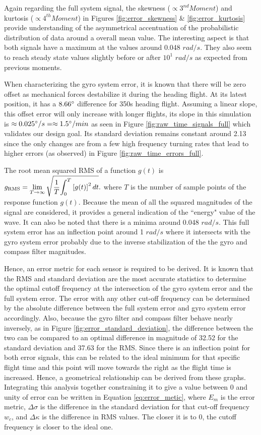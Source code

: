 Again regarding the full system signal, the skewness ($\propto 3^{nd} Moment$) and kurtosis ($\propto 4^{th} Moment$) in Figures \ref{fig:error_skewness} \& \ref{fig:error_kurtosis}  provide understanding of the asymmetrical accentuation of the probabilistic distribution of data around a overall mean value. The interesting aspect is that both signals have a maximum at the values around 0.048 $rad/s$. They also seem to reach steady state values slightly before or after $10^1$ $rad/s$ as expected from previous moments.

When characterizing the gyro system error, it is known that there will be zero offset as mechanical forces destabilize it during the heading flight. At its latest position, it has a $8.66 \degree$ difference for 350s heading flight. Assuming a linear slope, this offset error will only increase with longer flights, its slope in this simulation is $\approx 0.025 \degree/s = \approx 1.5 \degree/min$ as seen in Figure \ref{fig:raw_time_signals_full} which validates our design goal. Its standard deviation remains constant around 2.13 since the only changes are from a few high frequency turning rates that lead to higher errors (as observed) in Figure \ref{fig:raw_time_errors_full}.

The root mean squared RMS of a function $g(t)$ is ${\displaystyle g_{\text{RMS}}=\lim _{T\rightarrow \infty }{\sqrt {{1 \over {T}}{\int _{0}^{T}{[g(t)]}^{2}\,dt}}}.}$ where $T$ is the number of sample points of the response function $g(t)$. Because the mean of all the squared magnitudes of the signal are considered, it provides a general indication of the ``energy" value of the wave. It can also be noted that there is a minima around 0.048 $rad/s$. This full system error has an inflection point around 1 $rad/s$ where it intersects with the gyro system error probably due to the inverse stabilization of the the gyro and compass filter magnitudes.

Hence, an error metric for each sensor is required to be derived. It is known that the RMS and standard deviation are the most accurate statistics to determine the optimal cutoff frequency at the intersection of the gyro system error and the full system error. The error with any other cut-off frequency can be determined by the absolute difference between the full system error and gyro system error accordingly. Also, because the gyro filter and compass filter behave nearly inversely, as in Figure \ref{fig:error_standard_deviation}, the difference between the two can be compared to an optimal difference in magnitude of 32.52 for the standard deviation and 37.63 for the RMS. Since there is an inflection point for both error signals, this can be related to the ideal minimum for that specific flight time and this point will move towards the right as the flight time is increased. Hence, a geometrical relationship can be derived from these graphs. Integrating this analysis together constraining it to give a value between 0 and unity of error can be written in Equation \ref{eq:error_metic}, where $E_m$ is the error metric, $\Delta\sigma$ is the difference in the standard deviation for that cut-off frequency $w_c$, and $\Delta\kappa$ is the difference in RMS values. The closer it is to 0, the cutoff frequency is closer to the ideal one.


